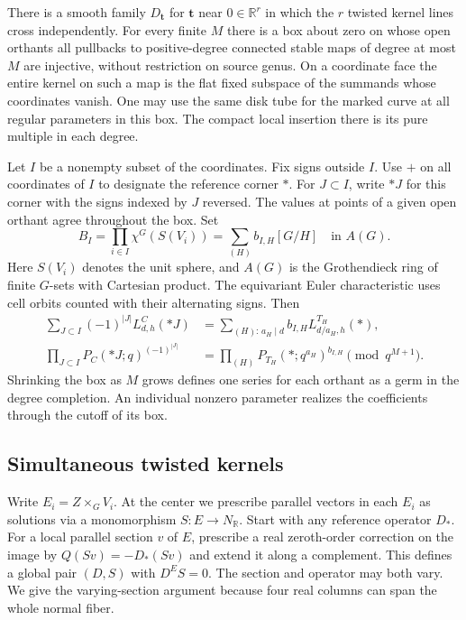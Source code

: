 \begin{theorem}\label{thm:mixed} There is a smooth family $D_{\mathbf t}$ for $\mathbf t$ near $0\in\mathbb R^r$ in which the $r$ twisted kernel lines cross independently. For every finite $M$ there is a box about zero on whose open orthants all pullbacks to positive-degree connected stable maps of degree at most $M$ are injective, without restriction on source genus. On a coordinate face the entire kernel on such a map is the flat fixed subspace of the summands whose coordinates vanish. One may use the same disk tube for the marked curve at all regular parameters in this box. The compact local insertion there is its pure multiple in each degree.

Let $I$ be a nonempty subset of the coordinates. Fix signs outside $I$. Use $+$ on all coordinates of $I$ to designate the reference corner $*$. For $J\subset I$, write $*J$ for this corner with the signs indexed by $J$ reversed. The values at points of a given open orthant agree throughout the box. Set
\[
 B_I=\prod_{i\in I}\chi^G(S(V_i))
    =\sum_{(H)}b_{I,H}[G/H]\quad\text{in }A(G).
\]
Here $S(V_i)$ denotes the unit sphere, and $A(G)$ is the Grothendieck ring of finite $G$-sets with Cartesian product. The equivariant Euler characteristic uses cell orbits counted with their alternating signs. Then
\begin{equation}
\begin{aligned}
 \sum_{J\subset I}(-1)^{|J|}L^C_{d,h}(*J)
    &=\sum_{(H):\,a_H\mid d}b_{I,H}L^{T_H}_{d/a_H,h}(*),\\
 \prod_{J\subset I}P_C(*J;q)^{(-1)^{|J|}}
    &=\prod_{(H)}P_{T_H}(*;q^{a_H})^{b_{I,H}}
            \pmod {q^{M+1}}.
\end{aligned}\label{eq:mixed}
\end{equation}
Shrinking the box as $M$ grows defines one series for each orthant as a germ in the degree completion. An individual nonzero parameter realizes the coefficients through the cutoff of its box.

\end{theorem}

\subsection{Simultaneous twisted kernels}\label{simultaneous-twisted-kernels}

Write \(E_i=Z\times_G V_i\). At the center we prescribe parallel vectors in each \(E_i\) as solutions via a monomorphism \(S:E\to N_{\mathbb R}\). Start with any reference operator \(D_*\). For a local parallel section \(v\) of \(E\), prescribe a real zeroth-order correction on the image by \(Q(Sv)=-D_*(Sv)\) and extend it along a complement. This defines a global pair \((D,S)\) with \(D^E S=0\). The section and operator may both vary. We give the varying-section argument because four real columns can span the whole normal fiber.


